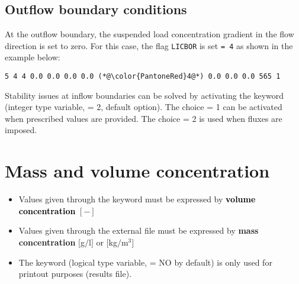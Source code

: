 \subsection{Outflow boundary conditions}
At the outflow boundary, the suspended load concentration gradient in the flow direction is set to zero. For this case, the flag \texttt{LICBOR} is set \texttt{= 4} as shown in the example below:

\begin{lstlisting}[frame=trBL]
5 4 4 0.0 0.0 0.0 0.0 (*@\color{PantoneRed}4@*) 0.0 0.0 0.0 565 1
\end{lstlisting}

Stability issues at inflow boundaries can be solved by activating the keyword  (integer type variable, {\ttfamily = 2}, default option). The choice {\ttfamily = 1} can be activated when prescribed values are provided. The choice {\ttfamily = 2} is used when fluxes are imposed.

\section{Mass and volume concentration}
\begin{itemize}
\item Values given through the keyword  must be expressed by \textcolor{black}{\textbf{volume concentration}} $[-]$
\item Values given through the external file must be expressed by {\textbf{mass concentration}} $[$g$/$l$]$ or $[$kg$/$m$^3]$
\item The keyword  (logical type variable, {\ttfamily = NO} by default) is only used for printout purposes (results file).
\end{itemize}

